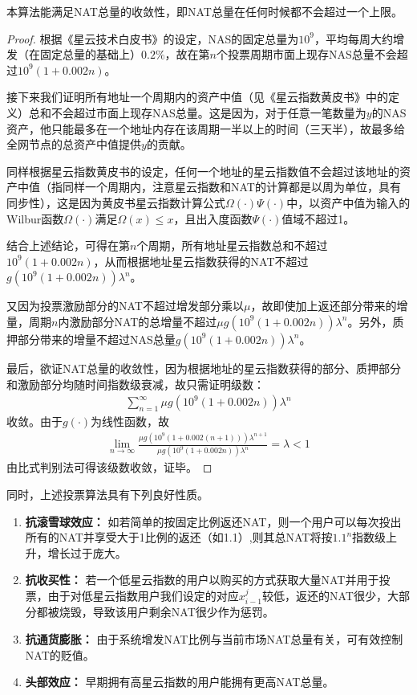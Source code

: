 \begin{property}
本算法能满足NAT总量的收敛性，即NAT总量在任何时候都不会超过一个上限。
\end{property}
\begin{proof}
	根据《星云技术白皮书》的设定，NAS的固定总量为$10^9$，平均每周大约增发（在固定总量的基础上）$0.2\%$，故在第$n$个投票周期市面上现存NAS总量不会超过$10^9(1+0.002n)$。
	
	接下来我们证明所有地址一个周期内的资产中值（见《星云指数黄皮书》中的定义）总和不会超过市面上现存NAS总量。这是因为，对于任意一笔数量为$y$的NAS资产，他只能最多在一个地址内存在该周期一半以上的时间（三天半），故最多给全网节点的总资产中值提供$y$的贡献。
	
	同样根据星云指数黄皮书的设定，任何一个地址的星云指数值不会超过该地址的资产中值（指同样一个周期内，注意星云指数和NAT的计算都是以周为单位，具有同步性），这是因为黄皮书星云指数计算公式$\Omega(\cdot)\Psi(\cdot)$中，以资产中值为输入的Wilbur函数$\Omega(\cdot)$满足$\Omega(x)\leq x$，且出入度函数$\Psi(\cdot)$值域不超过1。
	
	结合上述结论，可得在第$n$个周期，所有地址星云指数总和不超过$10^9(1+0.002n)$，从而根据地址星云指数获得的NAT不超过$g(10^9(1+0.002n))\lambda^n$。
	
	又因为投票激励部分的NAT不超过增发部分乘以$\mu$，故即使加上返还部分带来的增量，周期$n$内激励部分NAT的总增量不超过$\mu g(10^9(1+0.002n))\lambda^n$。另外，质押部分带来的增量不超过NAS总量$g(10^9(1+0.002n))\lambda^n$。
	
	最后，欲证NAT总量的收敛性，因为根据地址的星云指数获得的部分、质押部分和激励部分均随时间指数级衰减，故只需证明级数：
	\begin{align}
	\sum_{n=1}^{\infty} \mu g(10^9(1+0.002n))\lambda^n
	\end{align}
	收敛。由于$g(\cdot)$为线性函数，故
	\begin{align}
	\lim_{n\rightarrow \infty} \frac{\mu g(10^9(1+0.002(n+1)))\lambda^{n+1}}{\mu g(10^9(1+0.002n))\lambda^n} = \lambda <1
	\end{align}
	由比式判别法可得该级数收敛，证毕。
\end{proof}
同时，上述投票算法具有下列良好性质。
\begin{enumerate}
	\item \textbf{抗滚雪球效应：} 如若简单的按固定比例返还NAT，则一个用户可以每次投出所有的NAT并享受大于1比例的返还（如1.1）,则其总NAT将按$1.1^n$指数级上升，增长过于庞大。
	\item \textbf{抗收买性：} 若一个低星云指数的用户以购买的方式获取大量NAT并用于投票，由于对低星云指数用户我们设定的对应$x_{i-1}^j$较低，返还的NAT很少，大部分都被烧毁，导致该用户剩余NAT很少作为惩罚。
	\item \textbf{抗通货膨胀：} 由于系统增发NAT比例与当前市场NAT总量有关，可有效控制NAT的贬值。
	\item \textbf{头部效应：} 早期拥有高星云指数的用户能拥有更高NAT总量。
\end{enumerate}